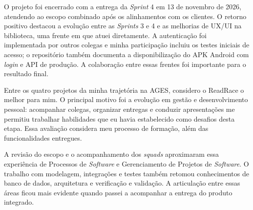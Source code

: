 O projeto foi encerrado com a entrega da \textit{Sprint} 4 em 13 de novembro de 2026, atendendo ao escopo combinado após os alinhamentos com os clientes. O retorno positivo destacou a evolução entre as \textit{Sprints} 3 e 4 e as melhorias de \ac{UX}/\ac{UI} na biblioteca, uma frente em que atuei diretamente. A autenticação foi implementada por outros colegas e minha participação incluiu os testes iniciais de acesso; o repositório também documenta a disponibilização do \ac{APK} Android com \textit{login} e \ac{API} de produção. A colaboração entre essas frentes foi importante para o resultado final.

Entre os quatro projetos da minha trajetória na \ac{AGES}, considero o ReadRace o melhor para mim. O principal motivo foi a evolução em gestão e desenvolvimento pessoal: acompanhar colegas, organizar entregas e conduzir apresentações me permitiu trabalhar habilidades que eu havia estabelecido como desafios desta etapa. Essa avaliação considera meu processo de formação, além das funcionalidades entregues.

A revisão do escopo e o acompanhamento dos \textit{squads} aproximaram essa experiência de Processos de \textit{Software} e Gerenciamento de Projetos de \textit{Software}. O trabalho com modelagem, integrações e testes também retomou conhecimentos de banco de dados, arquitetura e verificação e validação. A articulação entre essas áreas ficou mais evidente quando passei a acompanhar a entrega do produto integrado.
